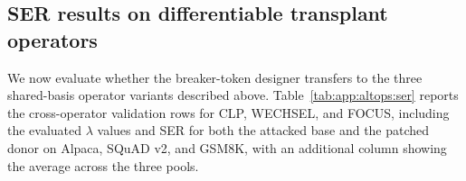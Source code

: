\documentclass{article}
\theoremstyle{plain}
\theoremstyle{definition}
\theoremstyle{remark}
\begin{document}
\subsection{SER results on differentiable transplant operators}
\label{sec:altops-results}

We now evaluate whether the breaker-token designer transfers to the three shared-basis operator variants described above. Table~\ref{tab:app:altops:ser} reports the cross-operator validation rows for CLP, WECHSEL, and FOCUS, including the evaluated $\lambda$ values and SER for both the attacked base and the patched donor on Alpaca, SQuAD v2, and GSM8K, with an additional column showing the average across the three pools.


\begingroup
\small
\setlength{\tabcolsep}{1.8pt}
\renewcommand{\arraystretch}{1.05}
\end{document}

